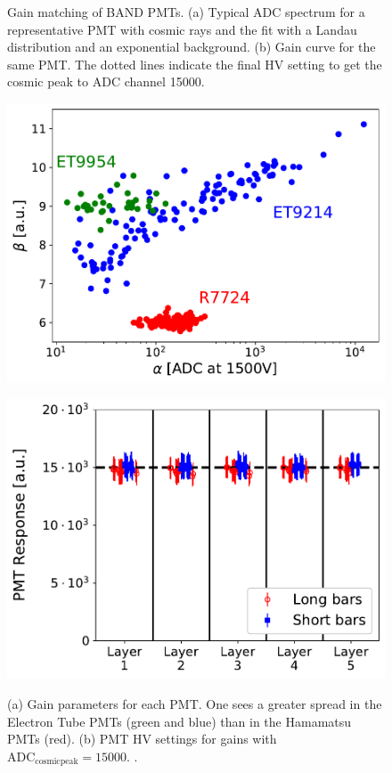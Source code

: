 \documentclass[3p,final,twocolumn]{elsarticle}
\begin{document}
\begin{figure}[th]
\begin{minipage}{0.47\textwidth}
			\subcaption{}
		\label{fig:gain-curve}
		\end{minipage}
		\caption{Gain matching of BAND PMTs. (a) Typical ADC spectrum for a representative PMT with cosmic rays and the fit with a Landau distribution and an exponential background. (b) Gain curve for the same PMT. The dotted lines indicate the final HV setting to get the cosmic peak to ADC channel 15000. }
\end{figure}


\begin{figure}[th]
	\centering
		\begin{minipage}{0.46\textwidth}
			\includegraphics[width=\textwidth]{gainspread.pdf}
			\subcaption{}
			\label{fig:gain}
		\end{minipage}
		\begin{minipage}{0.46\textwidth}
			\includegraphics[width=\textwidth]{gainsadcresponse.pdf}
			\subcaption{}
		\label{fig:hv_settings}
		\end{minipage}
		\caption{ (a) Gain parameters for each PMT. One sees a greater spread in the Electron Tube PMTs (green and blue) than in the Hamamatsu PMTs (red).
		(b) PMT HV settings for gains with $\mathrm{ADC}_{\mathrm{cosmic peak}} = 15000$. .}
\end{figure}
\end{document}
